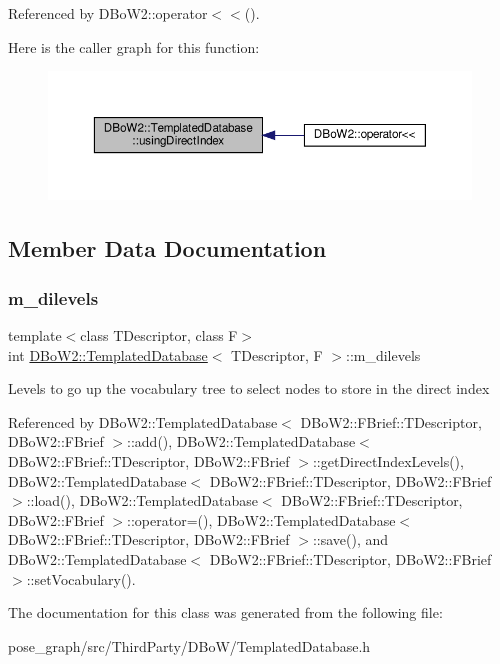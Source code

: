 Referenced by D\+Bo\+W2\+::operator$<$$<$().

Here is the caller graph for this function\+:\nopagebreak
\begin{figure}[H]
\begin{center}
\leavevmode
\includegraphics[width=350pt]{classDBoW2_1_1TemplatedDatabase_ad0fbf387b5707d6da34f0df05dc87401_icgraph}
\end{center}
\end{figure}


\subsection{Member Data Documentation}
\mbox{\label{classDBoW2_1_1TemplatedDatabase_a0cd32f1e5a9a0a6c61d976da754d507d}} 
\subsubsection{\texorpdfstring{m\+\_\+dilevels}{m\_dilevels}}
{\footnotesize\ttfamily template$<$class T\+Descriptor, class F$>$ \\
int \hyperlink{classDBoW2_1_1TemplatedDatabase}{D\+Bo\+W2\+::\+Templated\+Database}$<$ T\+Descriptor, F $>$\+::m\+\_\+dilevels\hspace{0.3cm}{\ttfamily [protected]}}

Levels to go up the vocabulary tree to select nodes to store in the direct index 

Referenced by D\+Bo\+W2\+::\+Templated\+Database$<$ D\+Bo\+W2\+::\+F\+Brief\+::\+T\+Descriptor, D\+Bo\+W2\+::\+F\+Brief $>$\+::add(), D\+Bo\+W2\+::\+Templated\+Database$<$ D\+Bo\+W2\+::\+F\+Brief\+::\+T\+Descriptor, D\+Bo\+W2\+::\+F\+Brief $>$\+::get\+Direct\+Index\+Levels(), D\+Bo\+W2\+::\+Templated\+Database$<$ D\+Bo\+W2\+::\+F\+Brief\+::\+T\+Descriptor, D\+Bo\+W2\+::\+F\+Brief $>$\+::load(), D\+Bo\+W2\+::\+Templated\+Database$<$ D\+Bo\+W2\+::\+F\+Brief\+::\+T\+Descriptor, D\+Bo\+W2\+::\+F\+Brief $>$\+::operator=(), D\+Bo\+W2\+::\+Templated\+Database$<$ D\+Bo\+W2\+::\+F\+Brief\+::\+T\+Descriptor, D\+Bo\+W2\+::\+F\+Brief $>$\+::save(), and D\+Bo\+W2\+::\+Templated\+Database$<$ D\+Bo\+W2\+::\+F\+Brief\+::\+T\+Descriptor, D\+Bo\+W2\+::\+F\+Brief $>$\+::set\+Vocabulary().



The documentation for this class was generated from the following file\+:\begin{DoxyCompactItemize}
\item 
pose\+\_\+graph/src/\+Third\+Party/\+D\+Bo\+W/Templated\+Database.\+h\end{DoxyCompactItemize}
